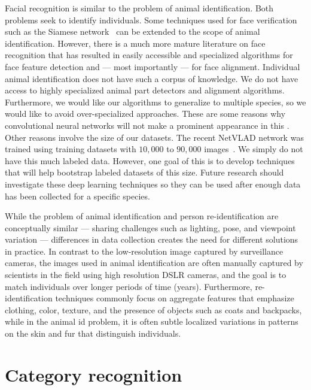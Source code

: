         Facial recognition is similar to the problem of animal identification.
        Both problems seek to identify individuals. Some techniques used for face verification such as the Siamese
        network~\cite{chopra_learning_2005, taigman_deepface_2014} can be extended to the scope of animal
        identification. However, there is a much more mature literature on face recognition that has resulted in
        easily accessible and specialized algorithms for face feature detection and --- most importantly --- for
        face alignment. Individual animal identification does not have such a corpus of knowledge. We do not have
        access to highly specialized animal part detectors and alignment algorithms. Furthermore, we would like our
        algorithms to generalize to multiple species, so we would like to avoid over-specialized approaches. These
        are some reasons why convolutional neural networks will not make a prominent appearance in this \thesis{}.
        Other reasons involve the size of our datasets. The recent NetVLAD network was trained using training
        datasets with $10,000$ to $90,000$ images~\cite{arandjelovic_netvlad_2016}. We simply do not have this much
        labeled data. However, one goal of this \thesis{} is to develop techniques that will help bootstrap labeled
        datasets of this size. Future research should investigate these deep learning techniques so they can be
        used after enough data has been collected for a specific species.

        While the problem of animal identification and person re-identification are conceptually similar ---
        sharing challenges such as lighting, pose, and viewpoint variation --- differences in data collection
        creates the need for different solutions in practice. In contrast to the low-resolution image captured by
        surveillance cameras, the images used in animal identification are often manually captured by scientists in
        the field using high resolution DSLR cameras, and the goal is to match individuals over longer periods of
        time (years). Furthermore, re-identification techniques commonly focus on aggregate features that emphasize
        clothing, color, texture, and the presence of objects such as coats and backpacks, while in the animal id
        problem, it is often subtle localized variations in patterns on the skin and fur that distinguish
        individuals.


\section{Category recognition}\label{sec:cr}  


